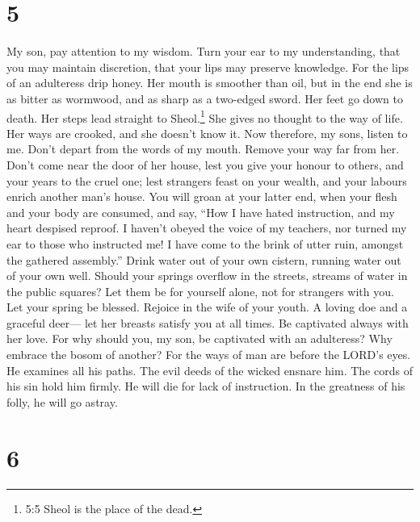 \hypertarget{section-4}{%
\section{5}\label{section-4}}

 My son, pay attention to my wisdom. Turn your ear to my
understanding,  that you may maintain discretion, that your
lips may preserve knowledge.  For the lips of an adulteress
drip honey. Her mouth is smoother than oil,  but in the end
she is as bitter as wormwood, and as sharp as a two-edged sword.
 Her feet go down to death. Her steps lead straight to
Sheol.\footnote{5:5 Sheol is the place of the dead.}  She
gives no thought to the way of life. Her ways are crooked, and she
doesn't know it.  Now therefore, my sons, listen to me.
Don't depart from the words of my mouth.  Remove your way
far from her. Don't come near the door of her house,  lest
you give your honour to others, and your years to the cruel one;
 lest strangers feast on your wealth, and your labours
enrich another man's house.  You will groan at your latter
end, when your flesh and your body are consumed,  and say,
``How I have hated instruction, and my heart despised reproof.
 I haven't obeyed the voice of my teachers, nor turned my
ear to those who instructed me!  I have come to the brink
of utter ruin, amongst the gathered assembly.''  Drink
water out of your own cistern, running water out of your own well.
 Should your springs overflow in the streets, streams of
water in the public squares?  Let them be for yourself
alone, not for strangers with you.  Let your spring be
blessed. Rejoice in the wife of your youth.  A loving doe
and a graceful deer--- let her breasts satisfy you at all times. Be
captivated always with her love.  For why should you, my
son, be captivated with an adulteress? Why embrace the bosom of another?
 For the ways of man are before the LORD's eyes. He
examines all his paths.  The evil deeds of the wicked
ensnare him. The cords of his sin hold him firmly.  He will
die for lack of instruction. In the greatness of his folly, he will go
astray.

\hypertarget{section-5}{%
\section{6}\label{section-5}}

